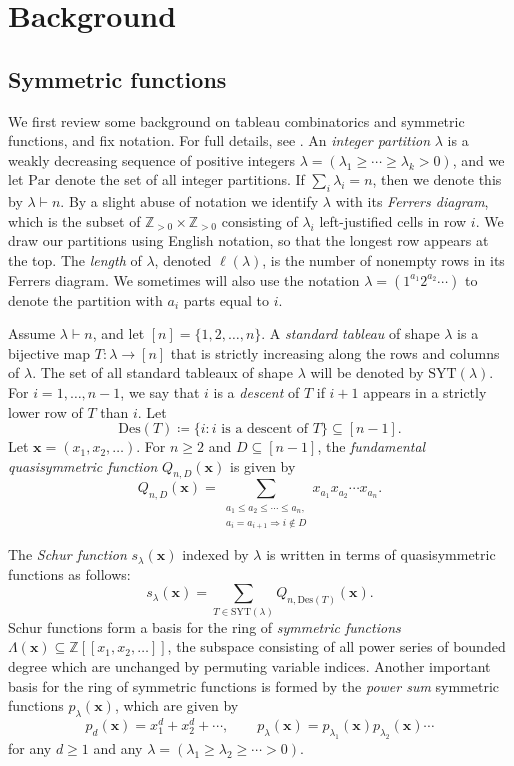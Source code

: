 \documentclass[11pt]{article}
\theoremstyle{definition}
\numberwithin{equation}{section}
\newcommand\ZZ{\mathbb{Z}}
\newcommand\Des{\mathrm{Des}}
\newcommand\SYT{\mathrm{SYT}}
\newcommand\xb{\mathbf{x}}
\begin{document}
\section{Background}\label{sec:background}
\subsection{Symmetric functions}\label{sec:symf}
We first review some background on tableau combinatorics and symmetric functions, and fix notation. For full details, see \cite[Chapter~7]{Stan}. An \emph{integer partition} $\lambda$ is a weakly decreasing sequence of positive integers $\lambda = (\lambda_1 \ge \cdots \ge \lambda_k > 0)$, and we let $\mathrm{Par}$ denote the set of all integer partitions. If $\sum_i \lambda_i = n$, then we denote this by $\lambda \vdash n$. By a slight abuse of notation we identify $\lambda$ with its \emph{Ferrers diagram}, which is the subset of $\ZZ_{>0} \times \ZZ_{>0}$ consisting of $\lambda_i$ left-justified cells in row $i$. We draw our partitions using English notation, so that the longest row appears at the top. The \emph{length} of $\lambda$, denoted $\ell(\lambda)$, is the number of nonempty rows in its Ferrers diagram. We sometimes will also use the notation $\lambda = (1^{a_1}2^{a_2} \cdots)$ to denote the partition with $a_i$ parts equal to $i$. 

Assume $\lambda \vdash n$, and let $[n] = \{ 1, 2, \ldots, n \}$. A \emph{standard tableau} of shape $\lambda$ is a bijective map $T : \lambda \to [n]$ that is strictly increasing along the rows and columns of $\lambda$. The set of all standard tableaux of shape $\lambda$ will be denoted by $\SYT(\lambda)$. For $i = 1, \ldots, n-1$, we say that $i$ is a \emph{descent} of $T$ if $i+1$ appears in a strictly lower row of $T$ than $i$. Let
\[
\Des(T) \coloneqq \{ i : i \text{ is a descent of } T \} \subseteq [n-1].
\]
Let $\xb = (x_1,x_2,\ldots)$. For $n \ge 2$ and $D \subseteq [n-1]$, the \emph{fundamental quasisymmetric function} $Q_{n,D}(\xb)$ is given by
\[
Q_{n,D}(\xb) = \sum_{\substack{a_1 \le a_2 \le \cdots \le a_n, \\ a_i = a_{i+1} \Rightarrow i \not\in D}} x_{a_1} x_{a_2} \cdots x_{a_n}.
\]

The \emph{Schur function} $s_\lambda(\xb)$ indexed by $\lambda$ is written in terms of quasisymmetric functions as follows:
\[
s_\lambda(\xb) = \sum_{T \in \SYT(\lambda)} Q_{n,\Des(T)}(\xb).
\]
Schur functions form a basis for the ring of \emph{symmetric functions} $\Lambda(\xb) \subseteq \ZZ[[x_1,x_2,\ldots]]$, the subspace consisting of all power series of bounded degree which are unchanged by permuting variable indices. Another important basis for the ring of symmetric functions is formed by the \emph{power sum} symmetric functions $p_\lambda(\xb)$, which are given by
\[
p_d(\xb) = x_1^d + x_2^d + \cdots, \qquad p_\lambda(\xb) = p_{\lambda_1}(\xb)p_{\lambda_2}(\xb) \cdots
\]
for any $d \ge 1$ and any $\lambda = (\lambda_1 \ge \lambda_2 \ge \cdots > 0)$.
\end{document}

